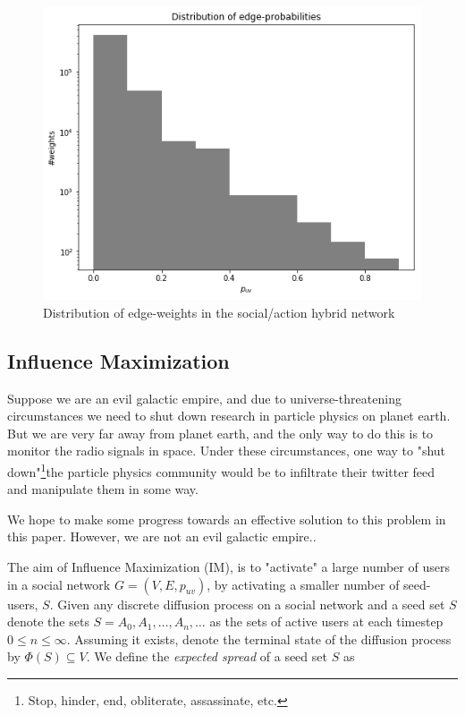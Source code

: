 \documentclass[sigconf]{acmart}
\begin{document}
\begin{figure}[htbp]
\begin{center}
\includegraphics[width=\linewidth]{Figures/puv_dist.png}
\caption{Distribution of edge-weights in the social/action hybrid network}
\label{puv_dist}
\end{center}
\end{figure}

\subsection{Influence Maximization}

Suppose we are an evil galactic empire, and due to universe-threatening circumstances we need to shut down research in particle physics on planet earth. But we are very far away from planet earth, and the only way to do this is to monitor the radio signals in space. Under these circumstances, one way to "shut down"\footnote{Stop, hinder, end, obliterate, assassinate, etc.}the particle physics community would be to infiltrate their twitter feed and manipulate them in some way. 

We hope to make some progress towards an effective solution to this problem in this paper. However, we are not an evil galactic empire..

The aim of Influence Maximization (IM), is to "activate" a large number of users in a social network $G = (V, E, p_{uv})$, by activating a smaller number of seed-users, $S$. Given any discrete diffusion process on a social network and a seed set $S$ denote the sets $S = A_0, A_1, \dots, A_n, \dots$ as the sets of active users at each timestep $0 \leq n \leq \infty$. Assuming it exists, denote the terminal state of the diffusion process by $\Phi(S) \subseteq V$. We define the \emph{expected spread} of a seed set $S$ as
\end{document}
